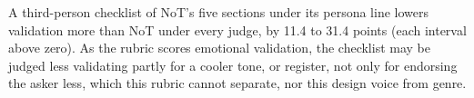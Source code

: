A third-person checklist of NoT's five sections under its persona line
lowers validation more than NoT under every judge, by 11.4 to 31.4 points
(each interval above zero).
As the rubric scores emotional validation, the checklist may be judged
less validating partly for a cooler tone, or register, not only for
endorsing the asker less, which this rubric cannot separate, nor this design
voice from genre.

